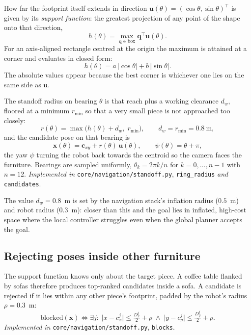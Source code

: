 \documentclass[11pt,a4paper]{article}
\begin{document}
How far the footprint itself extends in direction
$\mathbf{u}(\theta) = (\cos\theta, \sin\theta)^\top$ is given by its
\emph{support function}: the greatest projection of any point of the shape onto
that direction,
\begin{equation}
h(\theta) = \max_{\mathbf{q} \in \text{box}} \mathbf{q}^\top \mathbf{u}(\theta).
\end{equation}
For an axis-aligned rectangle centred at the origin the maximum is attained at a
corner and evaluates in closed form:
\begin{equation}
\boxed{\; h(\theta) = a\,\lvert\cos\theta\rvert + b\,\lvert\sin\theta\rvert. \;}
\end{equation}
The absolute values appear because the best corner is whichever one lies on the
same side as $\mathbf{u}$.

The standoff radius on bearing $\theta$ is that reach plus a working clearance
$d_w$, floored at a minimum $r_{\min}$ so that a very small piece is not
approached too closely:
\begin{equation}
r(\theta) = \max\big(h(\theta) + d_w,\; r_{\min}\big),
\qquad d_w = r_{\min} = 0.8\ \text{m},
\end{equation}
and the candidate pose on that bearing is
\begin{equation}
\mathbf{x}(\theta) = \mathbf{c}_{xy} + r(\theta)\, \mathbf{u}(\theta),
\qquad
\psi(\theta) = \theta + \pi ,
\end{equation}
the yaw $\psi$ turning the robot back towards the centroid so the camera faces
the furniture. Bearings are sampled uniformly, $\theta_k = 2\pi k/n$ for
$k = 0,\dots,n-1$ with $n = 12$.
\textit{Implemented in} \texttt{core/navigation/standoff.py}, \texttt{ring\_radius} \textit{and} \texttt{candidates}.

The value $d_w = 0.8$~m is set by the navigation stack's inflation radius
($0.5$~m) and robot radius ($0.3$~m): closer than this and the goal lies in
inflated, high-cost space where the local controller struggles even when the
global planner accepts the goal.

\subsection{Rejecting poses inside other furniture}

The support function knows only about the target piece. A coffee table flanked by
sofas therefore produces top-ranked candidates inside a sofa. A candidate is
rejected if it lies within any other piece's footprint, padded by the robot's
radius $\rho = 0.3$~m:
\begin{equation}
\boxed{\;
\text{blocked}(\mathbf{x}) \iff
\exists j : \;
\lvert x - c^{j}_x \rvert \le \tfrac{D^{j}_x}{2} + \rho
\;\wedge\;
\lvert y - c^{j}_y \rvert \le \tfrac{D^{j}_y}{2} + \rho .
\;}
\end{equation}
\textit{Implemented in} \texttt{core/navigation/standoff.py}, \texttt{blocks}.
\end{document}

